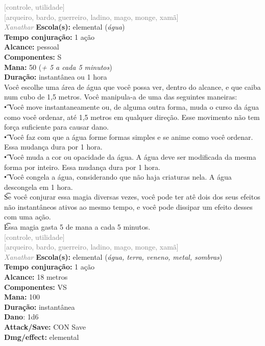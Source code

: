 \documentclass{RPG_Adventure}[2021/10/20]
\begin{document}
{\scriptsize \textcolor{gray}{[controle, utilidade]\\}}
{\scriptsize \textcolor{gray}{[arqueiro, bardo, guerreiro, ladino, mago, monge, xamã]\\}}
{\tiny \textcolor{gray}{\textit{Xanathar}}}\jump{}
{\small \t \textbf{Escola(s):} elemental (\textit{água})\\\t \textbf{Tempo conjuração:} 1 ação\\\t \textbf{Alcance:} pessoal\\\t \textbf{Componentes:} S\\\t \textbf{Mana:} 50 (\textit{+ 5 a cada 5 minutos})\\\t \textbf{Duração:} instantânea ou 1 hora\\}
{\normalsize Você escolhe uma área de água que você possa ver, dentro do alcance, e que caiba num cubo de 1,5 metros. Você manipula-a de uma das seguintes maneiras:\\\t • Você move instantaneamente ou, de alguma outra forma, muda o curso da água como você ordenar, até 1,5 metros em qualquer direção. Esse movimento não tem força suficiente para causar dano.\\\t • Você faz com que a água forme formas simples e se anime como você ordenar. Essa mudança dura por 1 hora.\\\t • Você muda a cor ou opacidade da água. A água deve ser modificada da mesma forma por inteiro. Essa mudança dura por 1 hora.\\\t • Você congela a água, considerando que não haja criaturas nela. A água descongela em 1 hora.\\\t Se você conjurar essa magia diversas vezes, você pode ter atê dois dos seus efeitos não instantâneos ativos ao mesmo tempo, e você pode dissipar um efeito desses com uma ação.\\\t Essa magia gasta 5 de mana a cada 5 minutos.\\}
{\scriptsize \textcolor{gray}{[controle, utilidade]\\}}
{\scriptsize \textcolor{gray}{[arqueiro, bardo, guerreiro, ladino, mago, monge, xamã]\\}}
{\tiny \textcolor{gray}{\textit{Xanathar}}}\jump{}
{\small \t \textbf{Escola(s):} elemental (\textit{água, terra, veneno, metal, sombras})\\\t \textbf{Tempo conjuração:} 1 ação\\\t \textbf{Alcance:} 18 metros\\\t \textbf{Componentes:} VS\\\t \textbf{Mana:} 100\\\t \textbf{Duração:} instantânea\\\t \textbf{Dano}: 1d6\\\t \textbf{Attack/Save:} CON Save\\\t \textbf{Dmg/effect:} elemental\\}
\end{document}
